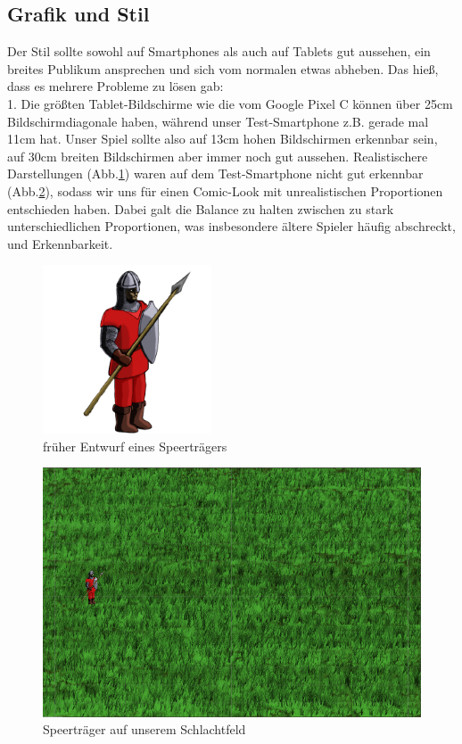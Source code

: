 \documentclass[extern,palatino]{cgBA}
\begin{document}
\subsection{Grafik und Stil}
Der Stil sollte sowohl auf Smartphones als auch auf Tablets gut aussehen, ein breites Publikum ansprechen und sich vom normalen etwas abheben. Das hieß, dass es mehrere Probleme zu lösen gab:
\\1. Die größten Tablet-Bildschirme wie die vom Google Pixel C können über 25cm Bildschirmdiagonale haben, während unser Test-Smartphone z.B. gerade mal 11cm hat. Unser Spiel sollte also auf 13cm hohen Bildschirmen erkennbar sein, auf 30cm breiten Bildschirmen aber immer noch gut aussehen. Realistischere Darstellungen (Abb.\ref{speerträger}) waren auf dem Test-Smartphone  nicht gut erkennbar (Abb.\ref{speerkarte}), sodass wir uns für einen Comic-Look mit unrealistischen Proportionen entschieden haben. Dabei galt die Balance zu halten zwischen zu stark unterschiedlichen Proportionen, was insbesondere ältere Spieler häufig abschreckt, und Erkennbarkeit.
\begin{figure}[H]
		\centering
		\includegraphics[height=5cm]{soldier.png}
		\caption{früher Entwurf eines Speerträgers}
		\label{speerträger}
\end{figure}
\begin{figure}[H]
		\centering
		\includegraphics[width=13cm]{soldierbackground.png}
		\caption{Speerträger auf unserem Schlachtfeld}
		\label{speerkarte}
\end{figure}
\end{document}

